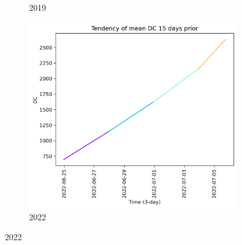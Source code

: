 \begin{figure}[h]
\begin{subfigure}{0.3\textwidth}
        \caption{2019}
        \label{fig:dc_prior_15_days_2019}
    \end{subfigure}
    \hfill
    \begin{subfigure}{0.3\textwidth}
        \centering
        \includegraphics[width=\textwidth]{graphs/15days/2022_15daysprior_tendency_graph_DC.png}
        \caption{2022}
        \label{fig:dc_prior_15_days_2022}
    \end{subfigure}
    
    \label{fig:dc_values_15days_prior}
\end{figure}

